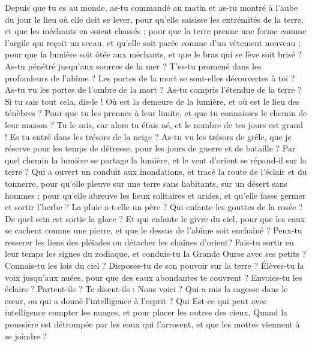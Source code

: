 \begin{multicols}{2}
Depuis que tu es au monde, as-tu commandé au matin et as-tu montré à l'aube du jour le lieu où elle doit se lever,
pour qu'elle saisisse les extrémités de la terre, et que les méchants en soient chassés ;
pour que la terre prenne une forme comme l'argile qui reçoit un sceau, et qu'elle soit parée comme d'un vêtement nouveau ;
pour que la lumière soit ôtée aux méchants, et que le bras qui se lève soit brisé ?
As-tu pénétré jusqu'aux sources de la mer ? T'es-tu promené dans les profondeurs de l'abîme ?
Les portes de la mort se sont-elles découvertes à toi ? As-tu vu les portes de l'ombre de la mort ?
As-tu compris l'étendue de la terre ? Si tu sais tout cela, dis-le !
Où est la demeure de la lumière, et où est le lieu des ténèbres ?
Pour que tu les prennes à leur limite, et que tu connaisses le chemin de leur maison ?
Tu le sais, car alors tu étais né, et le nombre de tes jours est grand !
Es tu entré dans les trésors de la neige ? As-tu vu les trésors de grêle,
que je réserve pour les temps de détresse, pour les jours de guerre et de bataille ?
Par quel chemin la lumière se partage la lumière, et le vent d'orient se répand-il sur la terre ?
Qui a ouvert un conduit aux inondations, et tracé la route de l'éclair et du tonnerre,
pour qu'elle pleuve sur une terre sans habitants, sur un désert sans hommes ;
pour qu'elle abreuve les lieux solitaires et arides, et qu'elle fasse germer et sortir l'herbe ?
La pluie a-t-elle un père ? Qui enfante les gouttes de la rosée ?
De quel sein est sortie la glace ? Et qui enfante le givre du ciel,
pour que les eaux se cachent comme une pierre, et que le dessus de l'abîme soit enchaîné ?
Peux-tu resserer les liens des pléiades ou détacher les chaînes d'orient?
Fais-tu sortir en leur temps les signes du zodiaque, et conduis-tu la Grande Ourse avec ses petits ?
Connais-tu les lois du ciel ? Disposes-tu de son pouvoir sur la terre ?
Élèves-tu la voix jusqu'aux nuées, pour que des eaux abondantes te couvrent ?
Envoies-tu les éclairs ? Partent-ils ? Te disent-ils : Nous voici ?
Qui a mis la sagesse dans le cœur, ou qui a donné l'intelligence à l'esprit ?
Qui Est-ce qui peut avec intelligence compter les nuages, et pour placer les outres des cieux,
Quand la poussière est détrompée par les eaux qui l'arrosent, et que les mottes viennent à se joindre ?

\end{multicols}

